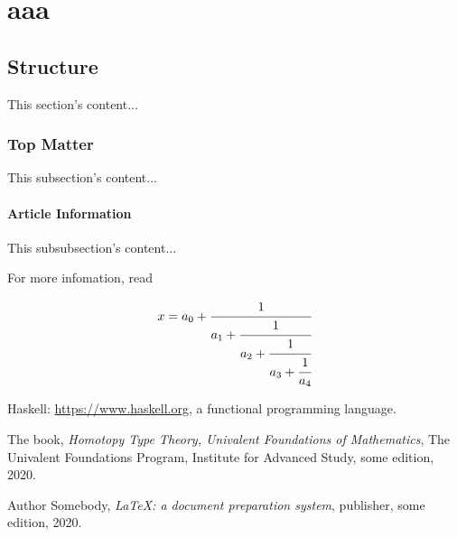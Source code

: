 \documentclass[12pt,a4paper]{report}
\begin{document}
\chapter{aaa}
\section{Structure}
This section's content...

\subsection{Top Matter}
This subsection's content...

\subsubsection{Article Information}
This subsubsection's content...

For more infomation, read \cite[p.~215]{template}\cite{template}

\begin{equation}
    x = a_0 + \cfrac{1}{a_1 
            + \cfrac{1}{a_2 
            + \cfrac{1}{a_3 + \cfrac{1}{a_4} } } }
  \end{equation}


\begin{thebibliography}{}

    Haskell: \url{https://www.haskell.org}, 
    a functional programming language.

    The book,
    \textit{Homotopy Type Theory, Univalent Foundations of Mathematics},
    The Univalent Foundations Program, 
    Institute for Advanced Study,
    some edition,
    2020.


    Author Somebody,
    \textit{\LaTeX: a document preparation system},
    publisher,
    some edition,
    2020.

\end{thebibliography}
\end{document}
